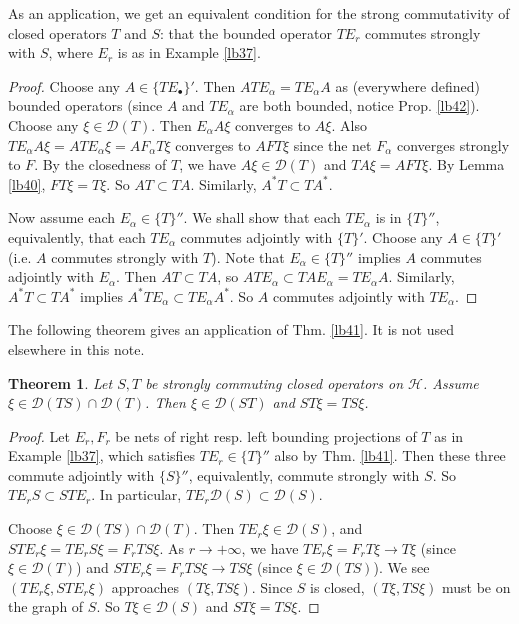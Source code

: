 \documentclass[12pt,b5paper,notitlepage]{article}
\theoremstyle{definition}
\theoremstyle{plain}
\newtheorem{thm}[df]{Theorem}
\newcommand{\mc}{\mathcal}
\newcommand{\Dom}{\scr D}
\newcommand{\scr}{\mathscr}
\newcommand{\blt}{\bullet}
\numberwithin{equation}{section}
\begin{document}
As an application, we get an equivalent condition for the strong commutativity of closed operators $T$ and $S$: that the bounded operator $TE_r$ commutes strongly with $S$, where $E_r$ is as in Example \ref{lb37}.


\begin{proof}
Choose any $A\in\{TE_\blt\}'$. Then $ATE_\alpha=TE_\alpha A$ as (everywhere defined) bounded operators (since $A$ and $TE_\alpha$ are both bounded, notice Prop. \ref{lb42}).  Choose any $\xi\in\Dom(T)$. Then $E_\alpha A\xi$ converges to $A\xi$. Also $TE_\alpha A\xi=ATE_\alpha\xi=AF_\alpha T\xi$ converges to $AFT\xi$ since the net $F_\alpha$ converges strongly to $F$. By the closedness of $T$, we have $A\xi\in\Dom(T)$ and $TA\xi=AFT\xi$. By Lemma \ref{lb40}, $FT\xi=T\xi$. So $AT\subset TA$. Similarly, $A^*T\subset TA^*$.
	
	
Now assume each $E_\alpha\in\{T\}''$. We shall show that each $TE_\alpha$ is in $\{T\}''$,  equivalently, that each $TE_\alpha$ commutes adjointly with $\{T\}'$. Choose any $A\in\{T\}'$ (i.e. $A$ commutes strongly with $T$). Note that $E_\alpha\in\{T\}''$ implies $A$ commutes adjointly with $E_\alpha$. Then $AT\subset TA$, so $ATE_\alpha\subset TAE_\alpha=TE_\alpha A$. Similarly, $A^*T\subset TA^*$ implies $A^*TE_\alpha\subset TE_\alpha A^*$. So $A$ commutes adjointly with $TE_\alpha$.
\end{proof}


The following theorem gives an application of Thm. \ref{lb41}. It is not used elsewhere in this note.



\begin{thm}\label{lb38}
Let $S,T$ be strongly commuting closed operators on $\mc H$. Assume $\xi\in\Dom(TS)\cap\Dom(T)$. Then $\xi\in\Dom(ST)$ and $ST\xi=TS\xi$.
\end{thm}


\begin{proof}
Let $E_r,F_r$ be  nets of right resp. left bounding projections of $T$ as in Example \ref{lb37}, which satisfies $TE_r\in\{T\}''$ also by Thm. \ref{lb41}. Then these three commute adjointly with $\{S\}''$, equivalently, commute strongly with $S$. So  $TE_rS\subset STE_r$. In particular, $TE_r\Dom(S)\subset\Dom(S)$. 

Choose $\xi\in\Dom(TS)\cap\Dom(T)$. Then $TE_r\xi\in\Dom(S)$, and $STE_r\xi=TE_rS\xi=F_rTS\xi$. As $r\rightarrow+\infty$, we have $TE_r\xi=F_rT\xi\rightarrow T\xi$ (since $\xi\in\Dom(T)$) and $STE_r\xi=F_rTS\xi\rightarrow TS\xi$ (since $\xi\in\Dom(TS)$). We see $(TE_r\xi,STE_r\xi)$ approaches $(T\xi,TS\xi)$. Since $S$ is closed, $(T\xi,TS\xi)$ must be on the graph of $S$. So $T\xi\in\Dom(S)$ and $ST\xi=TS\xi$.
\end{proof}
\end{document}
